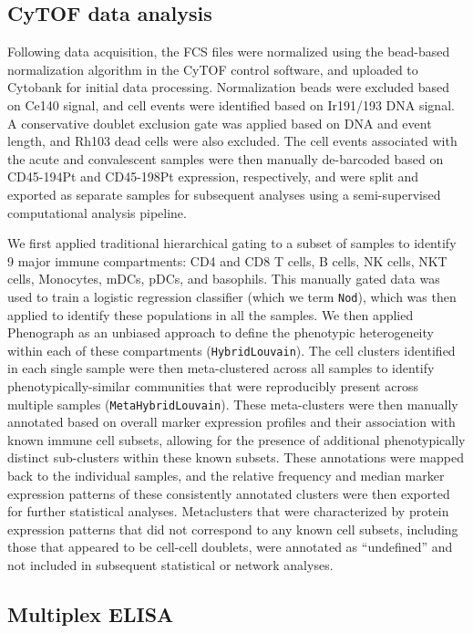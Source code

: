 \subsection{CyTOF data analysis}

Following data acquisition, the FCS files were normalized using the bead-based normalization algorithm in the CyTOF control software, and uploaded to Cytobank for initial data processing. Normalization beads were excluded based on Ce140 signal, and cell events were identified based on Ir191/193 DNA signal. A conservative doublet exclusion gate was applied based on DNA and event length, and Rh103\sups{+} dead cells were also excluded. The cell events associated with the acute and convalescent samples were then manually de-barcoded based on CD45-194Pt and CD45-198Pt expression, respectively, and were split and exported as separate samples for subsequent analyses using a semi-supervised computational analysis pipeline. 

We first applied traditional hierarchical gating to a subset of samples to identify 9 major immune compartments: CD4\sups{+} and CD8\sups{+} T cells, B cells, NK cells, NKT cells, Monocytes, mDCs, pDCs, and basophils. This manually gated data was used to train a logistic regression classifier (which we term \texttt{Nod}), which was then applied to identify these populations in all the samples. We then applied Phenograph\autocite{Levine2015a} as an unbiased approach to define the phenotypic heterogeneity within each of these compartments (\texttt{HybridLouvain}). The cell clusters identified in each single sample were then meta-clustered across all samples to identify phenotypically-similar communities that were reproducibly present across multiple samples (\texttt{MetaHybridLouvain}). These meta-clusters were then manually annotated based on overall marker expression profiles and their association with known immune cell subsets, allowing for the presence of additional phenotypically distinct sub-clusters within these known subsets. These annotations were mapped back to the individual samples, and the relative frequency and median marker expression patterns of these consistently annotated clusters were then exported for further statistical analyses. Metaclusters that were characterized by protein expression patterns that did not correspond to any known cell subsets, including those that appeared to be cell-cell doublets, were annotated as “undefined” and not included in subsequent statistical or network analyses.

\subsection{Multiplex ELISA}

